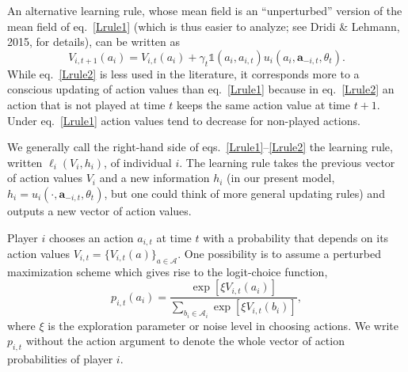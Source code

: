 \documentclass[11pt,reqno]{amsart}
\newcommand{\e}{\theta}
\newcommand{\At}{V}
\newcommand{\ac}{a}
\newcommand{\Ac}{\mathcal{A}}
\newcommand{\p}{p}
\newcommand{\va}{\mathbf{a}}
\newcommand{\iv}{\mathds{1}}
\newcommand{\lr}{\gamma}
\newcommand{\xr}{\xi}
\newcommand{\tm}{t}%
\newcommand{\ru}{\ell}
\newcommand{\pf}{u}
\begin{document}
An alternative learning rule, whose mean field is an ``unperturbed''  version of the mean field of eq.~\ref{Lrule1} (which is thus easier to analyze; see Dridi \& Lehmann, 2015, for details), can be written as
\begin{equation}
\label{Lrule2}
\At_{i,\tm+1}(\ac_i) = \At_{i,\tm}(\ac_i) + \lr_\tm  \iv(\ac_i,\ac_{i,\tm}) \pf_{i}(\ac_i,\va_{-i,\tm},\e_\tm).
\end{equation} 
While eq.~\ref{Lrule2} is less used in the literature, it corresponds more to a conscious updating of action values than eq.~\ref{Lrule1} because in eq.~\ref{Lrule2} an action that is not played at time $\tm$ keeps the same action value at time $\tm+1$. Under eq.~\ref{Lrule1} action values tend to decrease for non-played actions.

We generally call the right-hand side of eqs.~\ref{Lrule1}--\ref{Lrule2} the learning rule, written $\ru_i(\At_{i}, h_i)$, of individual $i$. The learning rule takes the previous vector of action values $\At_{i}$ and a new information $h_i$ (in our present model, $h_i = \pf_{i}(\cdot,\va_{-i,\tm},\e_\tm)$, but one could think of more general updating rules) and outputs a new vector of action values.

Player $i$ chooses an action $\ac_{i,\tm}$ at time $\tm$ with a probability that depends on its action values $\At_{i,\tm} = \{ \At_{i,\tm}(\ac) \}_{\ac\in\Ac}$. One possibility is to assume a perturbed maximization scheme which gives rise to the logit-choice function,
\begin{equation}
\label{logitchoice}
\p_{i,t}(\ac_i) = \frac{\exp[\xr \At_{i,t}(\ac_i)]}{\sum_{b_i\in \Ac_i} \exp[\xr \At_{i,t}(b_i)]},
\end{equation}
where $\xr$ is the exploration parameter or noise level in choosing actions. We write $\p_{i,t}$ without the action argument to denote the whole vector of action probabilities of player $i$.
\end{document}

